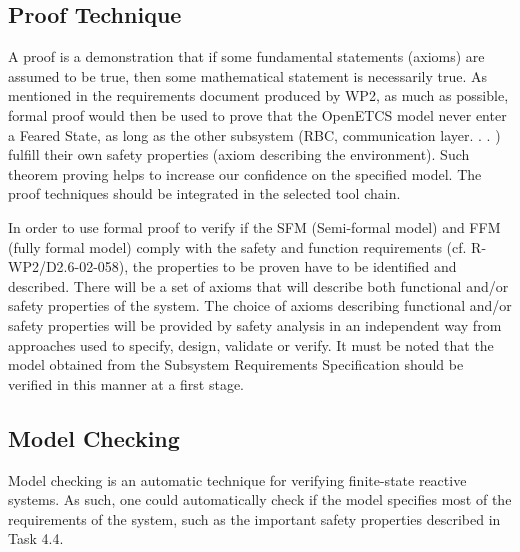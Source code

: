 
\subsection{Proof Technique}
A proof is a demonstration that if some fundamental statements (axioms) are assumed to be true, then some mathematical statement is necessarily true. As mentioned in the requirements document produced by WP2, as much as possible, formal proof would then be used to prove that the OpenETCS model never enter a Feared State, as long as the other subsystem (RBC, communication layer. . . ) fulfill their own safety properties (axiom describing the environment). Such theorem proving helps to increase our confidence on the specified model. The proof techniques should be integrated in the selected tool chain.

In order to use formal proof to verify if the SFM (Semi-formal model) and FFM (fully formal model) comply with the safety and function requirements (cf. R-WP2/D2.6-02-058), the properties to be proven have to be identified and described. There will be a set of axioms that will describe both functional and/or safety properties of the system. The choice of axioms describing functional and/or safety properties will be provided by safety analysis in an independent way from approaches used to specify, design, validate or verify. It must be noted that the model obtained from the Subsystem Requirements Specification should be verified in this manner at a first stage.


\subsection{Model Checking}
Model checking is an automatic technique for verifying finite-state reactive systems. As such, one could automatically check if the model specifies most of the requirements of the system, such as the important safety properties described in Task 4.4.

